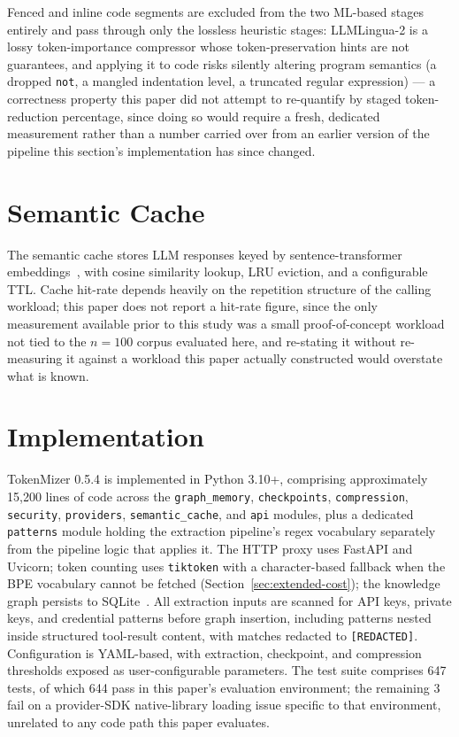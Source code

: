 \documentclass[journal]{IEEEtran}
\begin{document}
Fenced and inline code segments are excluded from the two
ML-based stages entirely and pass through only the lossless
heuristic stages: LLMLingua-2 is a lossy token-importance
compressor whose token-preservation hints are not guarantees,
and applying it to code risks silently altering program
semantics (a dropped \texttt{not}, a mangled indentation level,
a truncated regular expression) --- a correctness property this
paper did not attempt to re-quantify by staged token-reduction
percentage, since doing so would require a fresh, dedicated
measurement rather than a number carried over from an earlier
version of the pipeline this section's implementation has since
changed.

\section{Semantic Cache}
\label{sec:cache}

The semantic cache stores LLM responses keyed by
sentence-transformer embeddings~\cite{sentbert}, with cosine
similarity lookup, LRU eviction, and a configurable TTL.
Cache hit-rate depends heavily on the repetition structure of
the calling workload; this paper does not report a hit-rate
figure, since the only measurement available prior to this
study was a small proof-of-concept workload not tied to the
$n=100$ corpus evaluated here, and re-stating it without
re-measuring it against a workload this paper actually
constructed would overstate what is known.

\section{Implementation}
\label{sec:impl}

TokenMizer 0.5.4 is implemented in Python 3.10+, comprising
approximately 15{,}200 lines of code across the
\texttt{graph\_memory}, \texttt{checkpoints},
\texttt{compression}, \texttt{security}, \texttt{providers},
\texttt{semantic\_cache}, and \texttt{api} modules, plus a
dedicated \texttt{patterns} module holding the extraction
pipeline's regex vocabulary separately from the pipeline logic
that applies it.
The HTTP proxy uses FastAPI and Uvicorn; token counting uses
\texttt{tiktoken} with a character-based fallback when the BPE
vocabulary cannot be fetched (Section~\ref{sec:extended-cost});
the knowledge graph persists to SQLite~\cite{sqlite}.
All extraction inputs are scanned for API keys, private keys,
and credential patterns before graph insertion, including
patterns nested inside structured tool-result content, with
matches redacted to \texttt{[REDACTED]}.
Configuration is YAML-based, with extraction, checkpoint, and
compression thresholds exposed as user-configurable parameters.
The test suite comprises 647 tests, of which 644 pass in this
paper's evaluation environment; the remaining 3 fail on a
provider-SDK native-library loading issue specific to that
environment, unrelated to any code path this paper evaluates.
\end{document}
